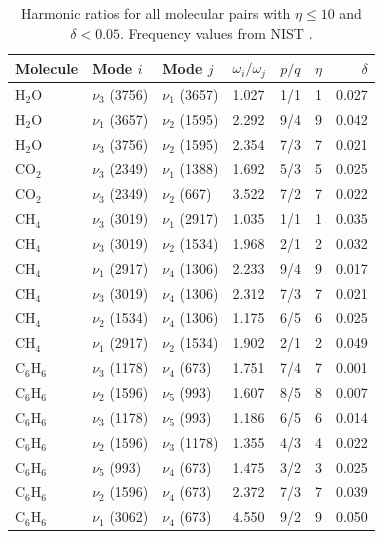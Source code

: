 \documentclass[11pt,a4paper]{article}
\theoremstyle{definition}
\theoremstyle{remark}
\begin{document}
\begin{table}[H]
\centering
\caption{Harmonic ratios for all molecular pairs with $\eta \leq 10$ and $\delta < 0.05$. Frequency values from NIST \citep{shimanouchi1972, huber1979, nist_webbook}.}
\label{tab:harmonic_ratios}
\small
\begin{tabular}{@{}llllccr@{}}
\toprule
Molecule & Mode $i$ & Mode $j$ & $\omega_i/\omega_j$ & $p/q$ & $\eta$ & $\delta$ \\
\midrule
H$_2$O & $\nu_3$ (3756) & $\nu_1$ (3657) & 1.027 & 1/1 & 1 & 0.027 \\
H$_2$O & $\nu_1$ (3657) & $\nu_2$ (1595) & 2.292 & 9/4 & 9 & 0.042 \\
H$_2$O & $\nu_3$ (3756) & $\nu_2$ (1595) & 2.354 & 7/3 & 7 & 0.021 \\
\midrule
CO$_2$ & $\nu_3$ (2349) & $\nu_1$ (1388) & 1.692 & 5/3 & 5 & 0.025 \\
CO$_2$ & $\nu_3$ (2349) & $\nu_2$ (667)  & 3.522 & 7/2 & 7 & 0.022 \\
\midrule
CH$_4$ & $\nu_3$ (3019) & $\nu_1$ (2917) & 1.035 & 1/1 & 1 & 0.035 \\
CH$_4$ & $\nu_3$ (3019) & $\nu_2$ (1534) & 1.968 & 2/1 & 2 & 0.032 \\
CH$_4$ & $\nu_1$ (2917) & $\nu_4$ (1306) & 2.233 & 9/4 & 9 & 0.017 \\
CH$_4$ & $\nu_3$ (3019) & $\nu_4$ (1306) & 2.312 & 7/3 & 7 & 0.021 \\
CH$_4$ & $\nu_2$ (1534) & $\nu_4$ (1306) & 1.175 & 6/5 & 6 & 0.025 \\
CH$_4$ & $\nu_1$ (2917) & $\nu_2$ (1534) & 1.902 & 2/1 & 2 & 0.049 \\
\midrule
C$_6$H$_6$ & $\nu_3$ (1178) & $\nu_4$ (673) & 1.751 & 7/4 & 7 & 0.001 \\
C$_6$H$_6$ & $\nu_2$ (1596) & $\nu_5$ (993) & 1.607 & 8/5 & 8 & 0.007 \\
C$_6$H$_6$ & $\nu_3$ (1178) & $\nu_5$ (993) & 1.186 & 6/5 & 6 & 0.014 \\
C$_6$H$_6$ & $\nu_2$ (1596) & $\nu_3$ (1178) & 1.355 & 4/3 & 4 & 0.022 \\
C$_6$H$_6$ & $\nu_5$ (993)  & $\nu_4$ (673)  & 1.475 & 3/2 & 3 & 0.025 \\
C$_6$H$_6$ & $\nu_2$ (1596) & $\nu_4$ (673)  & 2.372 & 7/3 & 7 & 0.039 \\
C$_6$H$_6$ & $\nu_1$ (3062) & $\nu_4$ (673)  & 4.550 & 9/2 & 9 & 0.050 \\
\bottomrule
\end{tabular}
\end{table}
\end{document}
